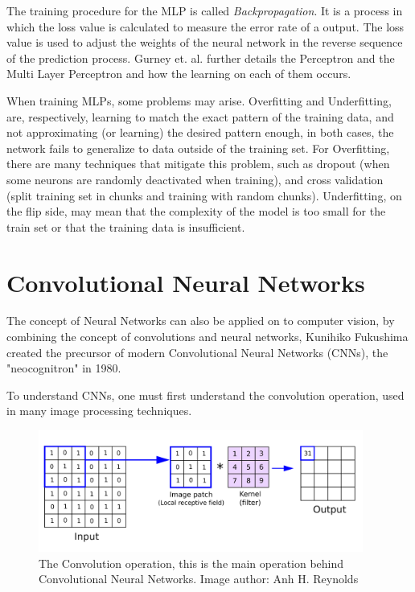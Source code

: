 The training procedure for the MLP is called \textit{Backpropagation}. It is a process in which the loss value is calculated to measure the error rate of a output. The loss value is used to adjust the weights of the neural network in the reverse sequence of the prediction process. Gurney et. al.\cite{gurney2018introduction} further details the Perceptron and the Multi Layer Perceptron and how the learning on each of them occurs.

When training MLPs, some problems may arise. Overfitting and Underfitting, are, respectively, learning to match the exact pattern of the training data, and not approximating (or learning) the desired pattern enough, in both cases, the network fails to generalize to data outside of the training set. For Overfitting, there are many techniques that mitigate this problem, such as dropout (when some neurons are randomly deactivated when training), and cross validation (split training set in chunks and training with random chunks). Underfitting, on the flip side, may mean that the complexity of the model is too small for the train set or that the training data is insufficient. 

\section{Convolutional Neural Networks}\label{sec:CNN}


The concept of Neural Networks can also be applied on to computer vision, by combining the concept of convolutions and neural networks, Kunihiko Fukushima created the precursor of modern Convolutional Neural Networks (CNNs), the "neocognitron"\cite{neocognitron1980} in 1980.

To understand CNNs, one must first understand the convolution operation, used in many image processing techniques.
\begin{figure}[!ht]
    \centering
    \includegraphics[width=0.95\textwidth]{img/convolution.png}
    \caption[The Convolution Operation]{The Convolution operation, this is the main operation behind Convolutional Neural Networks. Image author: Anh H. Reynolds\footnotemark}
    \label{fig:convolution}
\end{figure}

